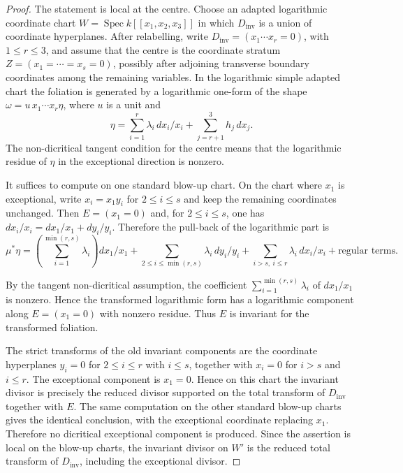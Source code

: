 \documentclass[11pt]{amsart}
\numberwithin{equation}{section}
\theoremstyle{plain}
\theoremstyle{definition}
\newcommand{\Spec}{\operatorname{Spec}}
\newcommand{\Dinv}{D_{\mathrm{inv}}}
\begin{document}
\begin{proof}
The statement is local at the centre. Choose an adapted logarithmic coordinate chart $W=\Spec k[[x_1,x_2,x_3]]$ in which $\Dinv$ is a union of coordinate hyperplanes. After relabelling, write $\Dinv=(x_1\cdots x_r=0)$, with $1\le r\le 3$, and assume that the centre is the coordinate stratum $Z=(x_1=\cdots=x_s=0)$, possibly after adjoining transverse boundary coordinates among the remaining variables. In the logarithmic simple adapted chart the foliation is generated by a logarithmic one-form of the shape $\omega=u\,x_1\cdots x_r\eta$, where $u$ is a unit and
\[
\eta=\sum_{i=1}^r\lambda_i\,dx_i/x_i+\sum_{j=r+1}^3 h_j\,dx_j.
\]
The non-dicritical tangent condition for the centre means that the logarithmic residue of $\eta$ in the exceptional direction is nonzero.

It suffices to compute on one standard blow-up chart. On the chart where $x_1$ is exceptional, write $x_i=x_1y_i$ for $2\le i\le s$ and keep the remaining coordinates unchanged. Then $E=(x_1=0)$ and, for $2\le i\le s$, one has $dx_i/x_i=dx_1/x_1+dy_i/y_i$. Therefore the pull-back of the logarithmic part is
\[
\mu^*\eta=\left(\sum_{i=1}^{\min(r,s)}\lambda_i\right)dx_1/x_1+\sum_{2\le i\le \min(r,s)}\lambda_i\,dy_i/y_i+\sum_{i>s,\ i\le r}\lambda_i\,dx_i/x_i+\text{regular terms}.
\]

By the tangent non-dicritical assumption, the coefficient $\sum_{i=1}^{\min(r,s)}\lambda_i$ of $dx_1/x_1$ is nonzero. Hence the transformed logarithmic form has a logarithmic component along $E=(x_1=0)$ with nonzero residue. Thus $E$ is invariant for the transformed foliation.

The strict transforms of the old invariant components are the coordinate hyperplanes $y_i=0$ for $2\le i\le r$ with $i\le s$, together with $x_i=0$ for $i>s$ and $i\le r$. The exceptional component is $x_1=0$. Hence on this chart the invariant divisor is precisely the reduced divisor supported on the total transform of $\Dinv$ together with $E$.
The same computation on the other standard blow-up charts gives the identical conclusion, with the exceptional coordinate replacing $x_1$. Therefore no dicritical exceptional component is produced. Since the assertion is local on the blow-up charts, the invariant divisor on $W'$ is the reduced total transform of $\Dinv$, including the exceptional divisor.
\end{proof}
\end{document}
